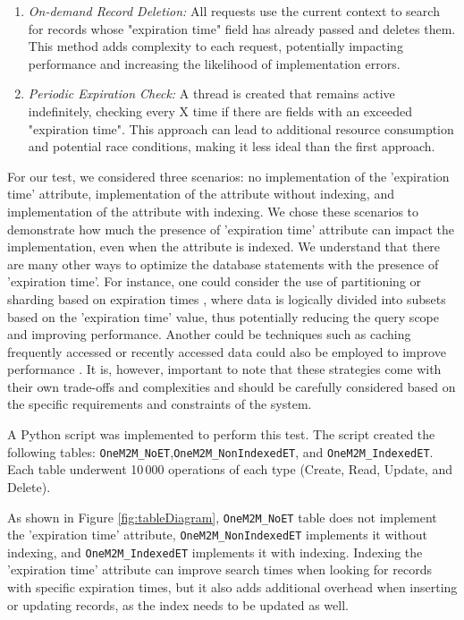 \documentclass[a4paper,fleqn]{cas-dc}
\begin{document}
\begin{enumerate}
    \item \textit{On-demand Record Deletion:} All requests use the current context to search for records whose "expiration time" field has already passed and deletes them. This method adds complexity to each request, potentially impacting performance and increasing the likelihood of implementation errors.
    \item \textit{Periodic Expiration Check:} A thread is created that remains active indefinitely, checking every X time if there are fields with an exceeded "expiration time". This approach can lead to additional resource consumption and potential race conditions, making it less ideal than the first approach.
\end{enumerate}

For our test, we considered three scenarios: no implementation of the 'expiration time' attribute, implementation of the attribute without indexing, and implementation of the attribute with indexing. We chose these scenarios to demonstrate how much the presence of 'expiration time' attribute can impact the implementation, even when the attribute is indexed. We understand that there are many other ways to optimize the database statements with the presence of 'expiration time'. For instance, one could consider the use of partitioning or sharding based on expiration times \cite{Vaidya2002}, where data is logically divided into subsets based on the 'expiration time' value, thus potentially reducing the query scope and improving performance. Another could be techniques such as caching frequently accessed or recently accessed data could also be employed to improve performance \cite{Mao2012, Xing2008}. It is, however, important to note that these strategies come with their own trade-offs and complexities and should be carefully considered based on the specific requirements and constraints of the system.

A Python script was implemented to perform this test. The script created the following tables: \texttt{OneM2M\_NoET},\newline \texttt{OneM2M\_NonIndexedET}, and \texttt{OneM2M\_IndexedET}. Each table underwent 10\,000 operations of each type (Create, Read, Update, and Delete).

As shown in Figure \ref{fig:tableDiagram}, \texttt{OneM2M\_NoET} table does not implement the 'expiration time' attribute, \texttt{OneM2M\_NonIndexedET} implements it without indexing, and \texttt{OneM2M\_IndexedET} implements it with indexing. Indexing the 'expiration time' attribute can improve search times when looking for records with specific expiration times, but it also adds additional overhead when inserting or updating records, as the index needs to be updated as well.
\end{document}
